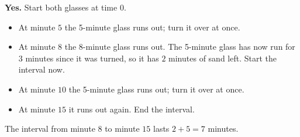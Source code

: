 \textbf{Yes.} Start both glasses at time $0$.
\begin{itemize}
\item At minute $5$ the 5-minute glass runs out; turn it over at once.
\item At minute $8$ the 8-minute glass runs out. The 5-minute glass has now run for $3$ minutes since it was turned, so it has $2$ minutes of sand left. Start the interval now.
\item At minute $10$ the 5-minute glass runs out; turn it over at once.
\item At minute $15$ it runs out again. End the interval.
\end{itemize}
The interval from minute $8$ to minute $15$ lasts $2+5=\boxed{7}$ minutes.
